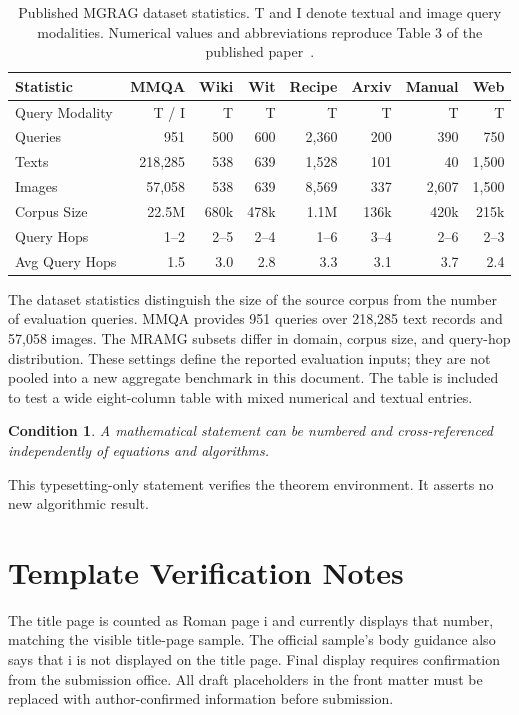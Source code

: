 \documentclass[customlatinfont=gyre,displaycommittee=false,blankpage=false]{template/hkust-thesis-v0.11.6/hkustthesis}
\newtheorem{smokecondition}{Condition}[chapter]
\begin{document}
\begin{table}[tbp]
\centering
\caption{Published MGRAG dataset statistics. T and I denote textual and image query modalities. Numerical values and abbreviations reproduce Table 3 of the published paper~\cite{smoke:mgrag}.}
\label{tab:smoke:datasets}
\small
\setlength{\tabcolsep}{3pt}
\begin{tabular}{lrrrrrrr}
\toprule
Statistic & MMQA & Wiki & Wit & Recipe & Arxiv & Manual & Web\\
\midrule
Query Modality & T / I & T & T & T & T & T & T\\
Queries & 951 & 500 & 600 & 2,360 & 200 & 390 & 750\\
Texts & 218,285 & 538 & 639 & 1,528 & 101 & 40 & 1,500\\
Images & 57,058 & 538 & 639 & 8,569 & 337 & 2,607 & 1,500\\
Corpus Size & 22.5M & 680k & 478k & 1.1M & 136k & 420k & 215k\\
Query Hops & 1--2 & 2--5 & 2--4 & 1--6 & 3--4 & 2--6 & 2--3\\
Avg Query Hops & 1.5 & 3.0 & 2.8 & 3.3 & 3.1 & 3.7 & 2.4\\
\bottomrule
\end{tabular}
\end{table}

The dataset statistics distinguish the size of the source corpus from the number of evaluation queries. MMQA provides 951 queries over 218,285 text records and 57,058 images. The MRAMG subsets differ in domain, corpus size, and query-hop distribution. These settings define the reported evaluation inputs; they are not pooled into a new aggregate benchmark in this document. The table is included to test a wide eight-column table with mixed numerical and textual entries.

\begin{smokecondition}
A mathematical statement can be numbered and cross-referenced independently of equations and algorithms.
\end{smokecondition}
This typesetting-only statement verifies the theorem environment. It asserts no new algorithmic result.
\printbibliography[heading=bibintoc,title=References]
\appendix
\chapter{Template Verification Notes}
The title page is counted as Roman page i and currently displays that number, matching the visible title-page sample. The official sample's body guidance also says that i is not displayed on the title page. Final display requires confirmation from the submission office. All draft placeholders in the front matter must be replaced with author-confirmed information before submission.
\end{document}
